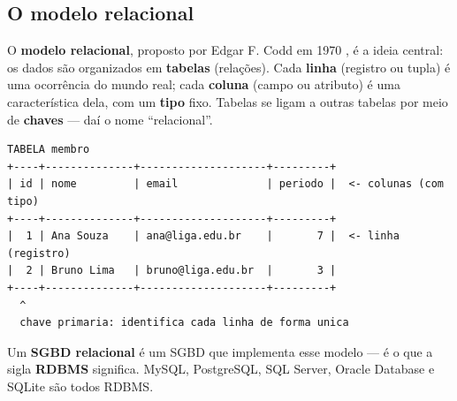 \subsection{O modelo relacional}

O \textbf{modelo relacional}, proposto por Edgar F. Codd em 1970
\cite{codd1970}, é a ideia central: os dados são organizados em
\textbf{tabelas} (relações). Cada \textbf{linha} (registro ou tupla) é uma
ocorrência do mundo real; cada \textbf{coluna} (campo ou atributo) é uma
característica dela, com um \textbf{tipo} fixo. Tabelas se ligam a outras
tabelas por meio de \textbf{chaves} --- daí o nome ``relacional''.

\newpage

\begin{lstlisting}[style=base,caption={Anatomia de uma tabela},label={lst:anatomia}]
TABELA membro
+----+--------------+--------------------+---------+
| id | nome         | email              | periodo |  <- colunas (com tipo)
+----+--------------+--------------------+---------+
|  1 | Ana Souza    | ana@liga.edu.br    |       7 |  <- linha (registro)
|  2 | Bruno Lima   | bruno@liga.edu.br  |       3 |
+----+--------------+--------------------+---------+
  ^
  chave primaria: identifica cada linha de forma unica
\end{lstlisting}

\begin{conceito}
Um \textbf{SGBD relacional} é um SGBD que implementa esse modelo --- é o que a
sigla \textbf{RDBMS} significa. MySQL, PostgreSQL, SQL Server, Oracle Database
e SQLite são todos RDBMS.
\end{conceito}
